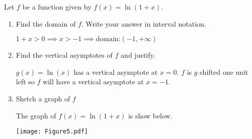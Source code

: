 \documentclass[nooutcomes,handout]{ximera}
\begin{document}
\begin{problem}
Let $f$ be a function given by $f(x)=\ln(1+x)$.

	\begin{enumerate}
	\item Find the domain of $f$.  Write your answer in interval notation.
	\begin{freeResponse}
	$1+x>0 \implies x>-1 \implies \text{domain:}(-1,+\infty)$
	\end{freeResponse}
	
	\item Find the vertical asymptotes of $f$ and justify.
	\begin{freeResponse}
	$g(x)=\ln(x)$ has a vertical asymptote at $x=0$.  $f$ is $g$ shifted one unit left so $f$ will have a vertical asymptote at $x=-1$. 
	
	\end{freeResponse}

	\item Sketch a graph of $f$

	\begin{freeResponse} The graph of $f(x)=\ln(1+x)$ is show below.
  \begin{center}
    \texttt{[image: Figure5.pdf]}
  \end{center}
	\end{freeResponse}
\end{enumerate}

\end{problem}
\end{document}
